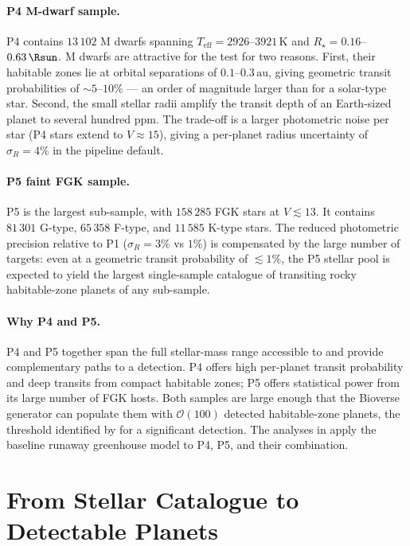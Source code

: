 \paragraph{P4 M-dwarf sample.}
P4 contains $13\,102$ M dwarfs spanning $T_\mathrm{eff} = 2926$--$3921\,\mathrm{K}$
and $R_\star = 0.16$--$0.63\,\Rsun$.  M dwarfs are attractive for the
\HZIED test for two reasons.  First, their habitable zones lie at orbital
separations of $0.1$--$0.3\,\mathrm{au}$, giving geometric transit
probabilities of $\sim 5$--$10\%$ — an order of magnitude larger than
for a solar-type star.  Second, the small stellar radii amplify the
transit depth of an Earth-sized planet to several hundred ppm.  The
trade-off is a larger photometric noise per star (P4 stars extend to
$V \approx 15$), giving a per-planet radius uncertainty of $\sigma_R = 4\%$
in the pipeline default.

\paragraph{P5 faint FGK sample.}
P5 is the largest sub-sample, with $158\,285$ FGK stars at $V \lesssim 13$.
It contains $81\,301$ G-type, $65\,358$ F-type, and $11\,585$ K-type
stars.  The reduced photometric precision relative to P1 ($\sigma_R = 3\%$
vs $1\%$) is compensated by the large number of targets: even at a
geometric transit probability of $\lesssim 1\%$, the P5 stellar pool is
expected to yield the largest single-sample catalogue of transiting
rocky habitable-zone planets of any \PLATO sub-sample.

\paragraph{Why P4 and P5.}
P4 and P5 together span the full stellar-mass range accessible to
\PLATO and provide complementary paths to a \HZIED detection.  P4
offers high per-planet transit probability and deep transits from compact
habitable zones; P5 offers statistical power from its large number of
FGK hosts.  Both samples are large enough that the Bioverse generator
can populate them with $\mathcal{O}(100)$ detected habitable-zone planets,
the threshold identified by \textcite{Schlecker2024} for a significant
detection.  The analyses in  apply the baseline
runaway greenhouse model to P4, P5, and their combination.


\section{From Stellar Catalogue to Detectable Planets}
\label{sec:planet_yield}

